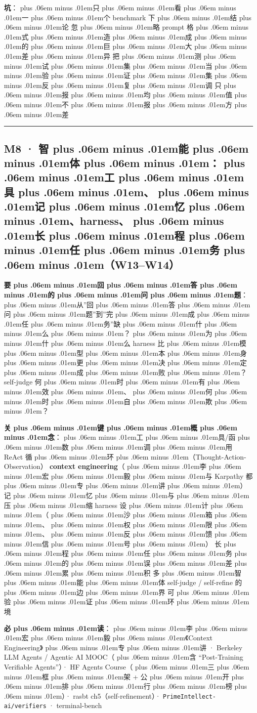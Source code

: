 \documentclass[
]{article}
\newcommand{\passthrough}[1]{#1}
\def\zh#1{{\zhfont #1}}
\def\sym#1{{\symfont #1}}
\def\zhglue{\hskip0pt plus .06em minus .01em}
\begin{document}
\textbf{\zh{坑}}\zh{：\zhglue 只\zhglue 看\zhglue 一\zhglue 个} benchmark \zh{下\zhglue 结\zhglue 论} \textbar{} \zh{忽\zhglue 略} prompt \zh{格\zhglue 式\zhglue 造\zhglue 成\zhglue 的\zhglue 巨\zhglue 大\zhglue 差\zhglue 异} \textbar{} \zh{把\zhglue 测\zhglue 试\zhglue 集\zhglue 当\zhglue 验\zhglue 证\zhglue 集\zhglue 反\zhglue 复\zhglue 调} \textbar{} \zh{只\zhglue 报\zhglue 均\zhglue 值\zhglue 不\zhglue 报\zhglue 方\zhglue 差}

\begin{center}\rule{0.5\linewidth}{0.5pt}\end{center}

\subsection{M8 \sym{·} \zh{智\zhglue 能\zhglue 体\zhglue ：\zhglue 工\zhglue 具\zhglue 、\zhglue 记\zhglue 忆\zhglue 、}harness\zh{、\zhglue 长\zhglue 程\zhglue 任\zhglue 务\zhglue （}W13--W14\zh{）}}\label{m8-ux667aux80fdux4f53ux5de5ux5177ux8bb0ux5fc6harnessux957fux7a0bux4efbux52a1w13w14}

\textbf{\zh{要\zhglue 回\zhglue 答\zhglue 的\zhglue 问\zhglue 题}}\zh{：\zhglue 从}''\zh{回\zhglue 答\zhglue 问\zhglue 题}''\zh{到}''\zh{完\zhglue 成\zhglue 任\zhglue 务}''\zh{缺\zhglue 什\zhglue 么\zhglue ？\zhglue 为\zhglue 什\zhglue 么} harness \zh{比\zhglue 模\zhglue 型\zhglue 本\zhglue 身\zhglue 更\zhglue 决\zhglue 定\zhglue 成\zhglue 败\zhglue ？}self-judge \zh{何\zhglue 时\zhglue 有\zhglue 效\zhglue 、\zhglue 何\zhglue 时\zhglue 自\zhglue 欺\zhglue ？}

\textbf{\zh{关\zhglue 键\zhglue 概\zhglue 念}}\zh{：\zhglue 工\zhglue 具}/\zh{函\zhglue 数\zhglue 调\zhglue 用} \textbar{} ReAct \zh{循\zhglue 环\zhglue （}Thought-Action-Observation\zh{）}\textbar{} \textbf{context engineering}\zh{（\zhglue 李\zhglue 宏\zhglue 毅\zhglue 与} Karpathy \zh{都\zhglue 专\zhglue 讲\zhglue ）}\textbar{} \zh{记\zhglue 忆\zhglue 与\zhglue 压\zhglue 缩} \textbar{} harness \zh{设\zhglue 计\zhglue （\zhglue 沙\zhglue 箱\zhglue 、\zhglue 权\zhglue 限\zhglue 、\zhglue 反\zhglue 馈\zhglue 信\zhglue 号\zhglue ）}\textbar{} \zh{长\zhglue 程\zhglue 任\zhglue 务\zhglue 的\zhglue 误\zhglue 差\zhglue 累\zhglue 积} \textbar{} \zh{多\zhglue 智\zhglue 能\zhglue 体} \textbar{} self-judge / self-refine \zh{的\zhglue 边\zhglue 界} \textbar{} \zh{可\zhglue 验\zhglue 证\zhglue 环\zhglue 境}

\textbf{\zh{必\zhglue 读}}\zh{：\zhglue 李\zhglue 宏\zhglue 毅\zhglue 《}Context Engineering\zh{》\zhglue 专\zhglue 讲} \sym{·} Berkeley LLM Agents / Agentic AI MOOC\zh{（\zhglue 含} ``Post-Training Verifiable Agents''\zh{）}\sym{·} HF Agents Course\zh{（\zhglue 三\zhglue 框\zhglue 架} + \zh{公\zhglue 开\zhglue 排\zhglue 行\zhglue 榜\zhglue ）}\sym{·} rasbt ch5\zh{（}self-refinement\zh{）}\sym{·} \passthrough{\lstinline!PrimeIntellect-ai/verifiers!} \sym{·} terminal-bench
\end{document}

